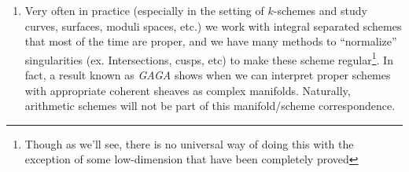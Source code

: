\documentclass{article}
\begin{document}
\begin{enumerate}
  \item Very often in practice (especially in the setting of $k$-schemes and study curves, surfaces, moduli
    spaces, etc.) we work with integral separated schemes that most of the time are proper, and we have many
    methods to ``normalize'' singularities (ex. Intersections, cusps, etc) to make these scheme
    regular\footnote{Though as we'll see, there is no universal way of doing this with the exception of some
    low-dimension that have been completely proved}. In fact, a result known as \emph{GAGA} shows when we can
    interpret proper schemes with appropriate coherent sheaves as complex manifolds. Naturally, arithmetic
    schemes will not be part of this manifold/scheme correspondence.
\end{enumerate}
\printbibliography
\end{document}
